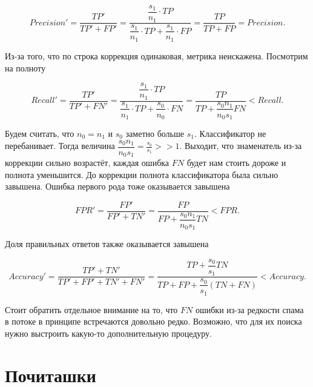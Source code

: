 \documentclass[12pt, a4paper, oneside]{article}
\begin{document}
\[
Precision' = \frac{TP'}{TP' + FP'} = \frac{\dfrac{s_1}{n_1} \cdot TP}{\dfrac{s_1}{n_1} \cdot TP + \dfrac{s_1}{n_1} \cdot  FP} = \frac{TP}{TP + FP} = Precision.
\]

Из-за того, что по строка коррекция одинаковая, метрика неискажена. Посмотрим на полноту 

\[
Recall' = \frac{TP'}{TP' + FN'} = \frac{\dfrac{s_1}{n_1} \cdot TP}{\dfrac{s_1}{n_1} \cdot TP + \dfrac{s_0}{n_0} \cdot  FN} = \frac{TP}{TP + \dfrac{s_0 n_1}{n_0 s_1} FN} < Recall.
\]

Будем считать, что $n_0 = n_1$ и $s_0$ заметно больше $s_1$. Классификатор не перебанивает. Тогда величина $\dfrac{s_0 n_1}{n_0 s_1} = \frac{s_0}{s_1} >> 1$. Выходит, что знаменатель из-за коррекции сильно возрастёт, каждая ошибка $FN$ будет нам стоить дороже и полнота уменьшится. До коррекции полнота классификатора была сильно завышена. Ошибка первого рода тоже оказывается завышена

\[
FPR' = \frac{FP'}{FP' + TN'} = \frac{FP}{FP + \dfrac{s_0 n_1}{n_0 s_1} TN} < FPR.
\]

Доля правильных ответов также оказывается завышена

\[
Accuracy' = \frac{TP' + TN'}{TP' + FP' + TN' +FN'} = \frac{TP + \dfrac{s_0}{s_1} TN}{TP + FP + \dfrac{s_0}{s_1}\left( TN + FN \right)} < Accuracy.
\]

Стоит обратить отдельное внимание на то, что $FN$ ошибки из-за редкости спама в потоке в принципе встречаются довольно редко. Возможно, что для их поиска нужно выстроить какую-то дополнительную процедуру.



\section*{Почиташки} 

\end{document}
